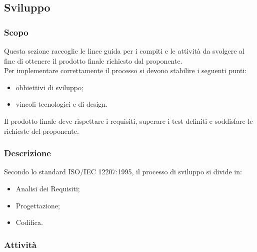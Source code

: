 \subsection{Sviluppo}

	\subsubsection{Scopo}
	Questa sezione raccoglie le linee guida per i compiti e le attività da svolgere al fine di ottenere il prodotto finale richiesto dal proponente. \\
	Per implementare correttamente il processo si devono stabilire i seguenti punti:
	\begin{itemize}
		\item obbiettivi di sviluppo;
		\item vincoli tecnologici e di design.
	\end{itemize}
	Il prodotto finale deve rispettare i requisiti, superare i test definiti e soddisfare le richieste del proponente.
	\subsubsection{Descrizione}
	Secondo lo standard ISO/IEC 12207:1995, il processo di sviluppo si divide in:
	\begin{itemize}
		\item Analisi dei Requisiti;
		\item Progettazione;
		\item Codifica.
	\end{itemize}
			
	\subsubsection{Attività}
				
